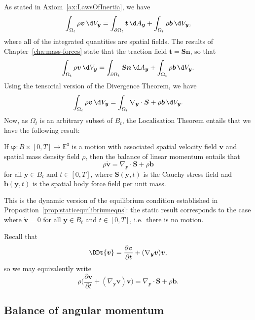 \documentclass[
  letterpaper,
  DIV=11,
  numbers=noendperiod]{scrreprt}
\theoremstyle{plain}
\theoremstyle{remark}
\begin{document}
As stated in Axiom~\hyperref[ax:LawsOfInertia]{{[}ax:LawsOfInertia{]}},
we have
\[\int_{\Omega_t}\rho{\boldsymbol{v}}{\,\d V_{{\boldsymbol{y}}}}=\int_{\partial\Omega_t}{\boldsymbol{t}}{\,\d A_{{\boldsymbol{y}}}}+\int_{\Omega_t}\rho{\boldsymbol{b}}{\,\d V_{{\boldsymbol{y}}}},\]
where all of the integrated quantities are spatial fields. The results
of Chapter~\hyperref[cha:mass-forces]{{[}cha:mass-forces{]}} state that
the traction field
\({\boldsymbol{t}}={\boldsymbol{S}}{\boldsymbol{n}}\), so that
\[\int_{\Omega_t}\rho{\boldsymbol{v}}{\,\d V_{{\boldsymbol{y}}}}=\int_{\partial\Omega_t}{\boldsymbol{S}}{\boldsymbol{n}}{\,\d A_{{\boldsymbol{y}}}}+\int_{\Omega_t}\rho{\boldsymbol{b}}{\,\d V_{{\boldsymbol{y}}}}.\]
Using the tensorial version of the Divergence Theorem, we have
\[\int_{\Omega_t}\rho{\boldsymbol{v}}{\,\d V_{{\boldsymbol{y}}}}=\int_{\Omega_t}\nabla_{\boldsymbol{y}}\cdot{\boldsymbol{S}}+\rho{\boldsymbol{b}}{\,\d V_{{\boldsymbol{y}}}}.\]
Now, as \(\Omega_t\) is an arbitrary subset of \(B_t\), the Localisation
Theorem entails that we have the following result:

\label{prop:LinearMomentumEulerian}{} If
\({\boldsymbol{\varphi}}:B\times[0,T]\to{\mathbb{E}}^3\) is a motion
with associated spatial velocity field \({\boldsymbol{v}}\) and spatial
mass density field \(\rho\), then the balance of linear momentum entails
that
\[\rho\dot{\boldsymbol{v}}=\nabla_{\boldsymbol{y}}\cdot{\boldsymbol{S}}+\rho{\boldsymbol{b}}\]
for all \({\boldsymbol{y}}\in B_t\) and \(t\in[0,T]\), where
\({\boldsymbol{S}}({\boldsymbol{y}},t)\) is the Cauchy stress field and
\({\boldsymbol{b}}({\boldsymbol{y}},t)\) is the spatial body force field
per unit mass.

This is the dynamic version of the equilibrium condition established in
Proposition~\hyperref[prop:staticequilibriumeqns]{{[}prop:staticequilibriumeqns{]}}:
the static result corresponds to the case where
\(\dot{\boldsymbol{v}}=0\) for all \({\boldsymbol{y}}\in B_t\) and
\(t\in[0,T]\), i.e.~there is no motion.

Recall that
\[\DDt{{\boldsymbol{v}}} = \frac{\partial{\boldsymbol{v}}}{\partial t} +(\nabla_{\boldsymbol{y}}{\boldsymbol{v}}){\boldsymbol{v}},\]
so we may equivalently write
\[\rho\bigg(\frac{\partial{\boldsymbol{v}}}{\partial t} +(\nabla_{\boldsymbol{y}}{\boldsymbol{v}}){\boldsymbol{v}}\bigg) = \nabla_{\boldsymbol{y}}\cdot{\boldsymbol{S}}+\rho{\boldsymbol{b}}.\]

\subsection{Balance of angular
momentum}\label{balance-of-angular-momentum}
\end{document}
